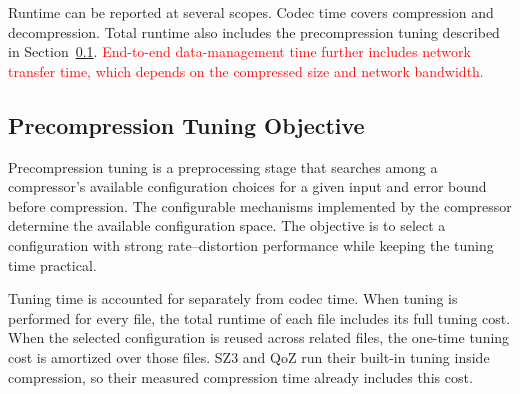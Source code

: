 Runtime can be reported at several scopes. Codec time covers compression and decompression. Total runtime also includes the precompression tuning described in Section~\ref{sec:background:tuning-objective}. \textcolor{red}{End-to-end data-management time further includes network transfer time, which depends on the compressed size and network bandwidth.}

\subsection{Precompression Tuning Objective}
\label{sec:background:tuning-objective}

Precompression tuning is a preprocessing stage that searches among a compressor's available configuration choices for a given input and error bound before compression. The configurable mechanisms implemented by the compressor determine the available configuration space. The objective is to select a configuration with strong rate--distortion performance while keeping the tuning time practical.

Tuning time is accounted for separately from codec time. When tuning is performed for every file, the total runtime of each file includes its full tuning cost. When the selected configuration is reused across related files, the one-time tuning cost is amortized over those files. SZ3 and QoZ run their built-in tuning inside compression, so their measured compression time already includes this cost.
